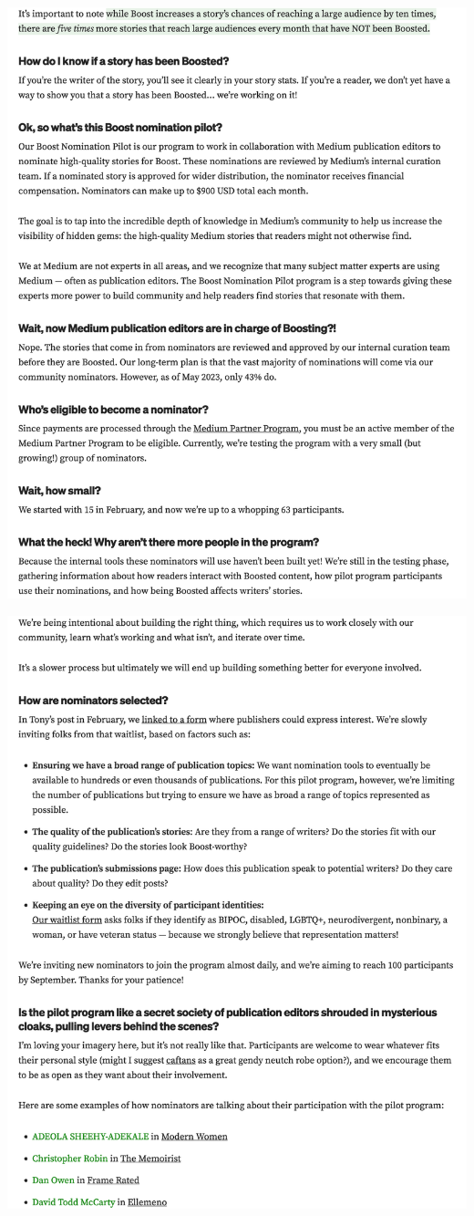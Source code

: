 \Continuing
\begin{center}
    \includegraphics[width=38em]{stallings-faq-p3}
\end{center}
\WillContinue
\pagebreak

\Continuing
\begin{center}
    \includegraphics[width=38em]{stallings-faq-p4}
\end{center}

\pagebreak
